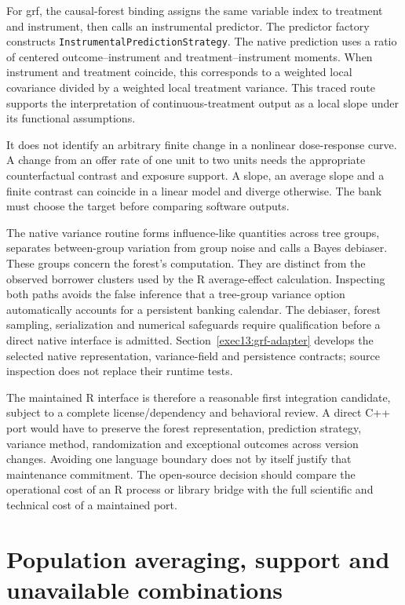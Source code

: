 For grf, the causal-forest binding assigns the same variable index to treatment
and instrument, then calls an instrumental predictor. The predictor factory
constructs \texttt{InstrumentalPredictionStrategy}. The native prediction uses
a ratio of centered outcome--instrument and treatment--instrument moments.
When instrument and treatment coincide, this corresponds to a weighted local
covariance divided by a weighted local treatment variance. This traced route
supports the interpretation of continuous-treatment output as a local slope
under its functional assumptions. \citep{v131_sw_grf}

It does not identify an arbitrary finite change in a nonlinear dose-response
curve. A change from an offer rate of one unit to two units needs the appropriate
counterfactual contrast and exposure support. A slope, an average slope and a
finite contrast can coincide in a linear model and diverge otherwise. The bank
must choose the target before comparing software outputs.

The native variance routine forms influence-like quantities across tree
groups, separates between-group variation from group noise and calls a Bayes
debiaser. These groups concern the forest's computation. They are distinct
from the observed borrower clusters used by the R average-effect calculation.
Inspecting both paths avoids the false inference that a tree-group variance
option automatically accounts for a persistent banking calendar. The debiaser,
forest sampling, serialization and numerical safeguards require qualification
before a direct native interface is admitted. Section~\ref{exec13:grf-adapter}
develops the selected native representation, variance-field and persistence
contracts; source inspection does not replace their runtime tests. \citep{v131_sw_grf}

The maintained R interface is therefore a reasonable first integration
candidate, subject to a complete license/dependency and behavioral review.
A direct C++ port would have to preserve the forest representation, prediction
strategy, variance method, randomization and exceptional outcomes across version
changes. Avoiding one language boundary does not by itself justify that
maintenance commitment. The open-source decision should compare the operational
cost of an R process or library bridge with the full scientific and technical
cost of a maintained port.

\section{Population averaging, support and unavailable combinations}

